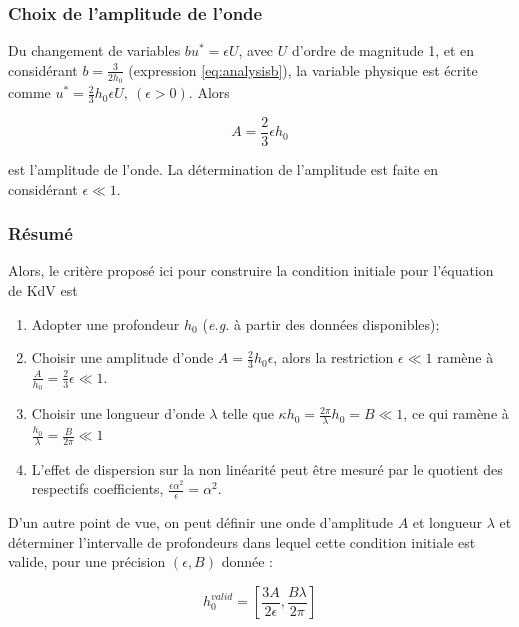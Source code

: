 \subsubsection{Choix de l'amplitude de l'onde}

\indent Du changement de variables $bu^* = \epsilon U$, avec $U$ d'ordre de magnitude 1, et en considérant $b = \frac{3}{2h_0}$ (expression \ref{eq:analysisb}), la variable physique est écrite comme $u^* = \frac{2}{3}h_0\epsilon U, \ (\epsilon > 0)$. Alors

\begin{equation*}
A = \frac{2}{3}\epsilon h_0
\end{equation*}

\noindent est l'amplitude de l'onde. La détermination de l'amplitude est faite en considérant $\epsilon \ll 1$. 

\subsubsection{Résumé}

\indent Alors, le critère proposé ici pour construire la condition initiale pour l'équation de KdV est 

\begin{enumerate}
\item Adopter une profondeur $h_0$ (\emph{e.g.} à partir des données disponibles);
\item Choisir une amplitude d'onde $A = \frac{2}{3}h_0\epsilon$, alors la restriction $\epsilon \ll 1$ ramène à $\frac{A}{h_0} = \frac{2}{3}\epsilon \ll 1$.
\item Choisir une longueur d'onde $\lambda$ telle que $\kappa h_0 = \frac{2\pi}{\lambda}h_0 = B \ll 1$, ce qui ramène à $\frac{h_0}{\lambda} = \frac{B}{2\pi} \ll 1$
\item L'effet de dispersion sur la non linéarité peut être mesuré par le quotient des respectifs coefficients, $\frac{\epsilon \alpha^2}{\epsilon} = \alpha^2$.
\end{enumerate}

\indent D'un autre point de vue, on peut définir une onde d'amplitude  $A$ et longueur $\lambda$ et déterminer l'intervalle de profondeurs dans lequel cette condition initiale est valide, pour une précision $(\epsilon,B)$ donnée :

\begin{equation} 
\label{eq:hvalid}
h_0^{valid} = \left[ \frac{3A}{2\epsilon}, \frac{B\lambda}{2\pi}\right]
\end{equation}

